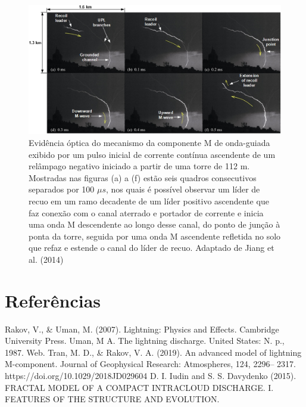 \documentclass[a4paper, 12pt, onecolumn,singlespacing]{article}
\begin{document}
	\begin{figure}[!h]
		\centering
		\includegraphics[width=\textwidth]{imagens/processo_componente_m.jpg}
		\caption{Evidência óptica do mecanismo da componente M de onda-guiada exibido por um pulso inicial de corrente contínua ascendente de um relâmpago negativo iniciado a partir de uma torre de 112 m. Mostradas nas figuras (a) a (f) estão seis quadros consecutivos separados por 100 $\mu s$, nos quais é possível observar um líder de recuo em um ramo decadente de um líder positivo ascendente que faz conexão com o canal aterrado e portador de corrente e inicia uma onda M descendente ao longo desse canal, do ponto de junção à ponta da torre, seguida por uma onda M ascendente refletida no solo que refaz e estende o canal do líder de recuo. Adaptado de Jiang et al. (2014)}
		\label{Component_M_explained}
	\end{figure}
	
	
	\pagebreak
	\section{Referências}
	\begin{thebibliography}{99}
		 Rakov, V., \& Uman, M. (2007). Lightning: Physics and Effects. Cambridge University Press.		
		  Uman, M A. The lightning discharge. United States: N. p., 1987. Web. 
		  Tran, M. D., \& Rakov, V. A. (2019). An advanced model of lightning M-component. Journal of Geophysical Research: Atmospheres, 124, 2296– 2317. https://doi.org/10.1029/2018JD029604 
		 D. I. Iudin and S. S. Davydenko (2015). FRACTAL MODEL OF A COMPACT INTRACLOUD DISCHARGE. I. FEATURES OF THE STRUCTURE AND EVOLUTION.
	\end{thebibliography}
\end{document}
